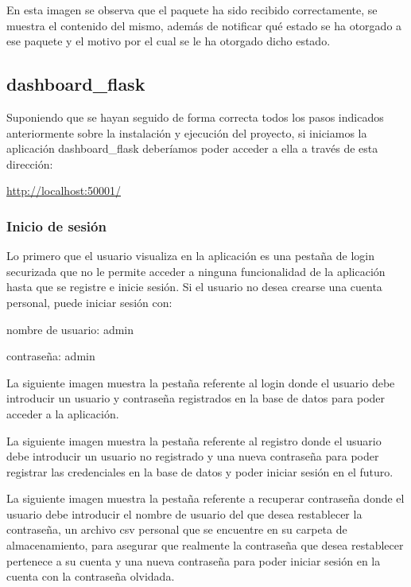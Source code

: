 En esta imagen se observa que el paquete ha sido recibido correctamente, se muestra el contenido del mismo, además de notificar qué estado se ha otorgado a ese paquete y el motivo por el cual se le ha otorgado dicho estado. 

\subsection{dashboard\_flask}
Suponiendo que se hayan seguido de forma correcta todos los pasos indicados anteriormente sobre la instalación y ejecución del proyecto, si iniciamos la aplicación dashboard\_flask deberíamos poder acceder a ella a través de esta dirección:

\href{http://localhost:5001/}{http://localhost:50001/}


\subsubsection{Inicio de sesión}
Lo primero que el usuario visualiza en la aplicación es una pestaña de login securizada que no le permite acceder a ninguna funcionalidad de la aplicación hasta que se registre e inicie sesión. Si el usuario no desea crearse una cuenta personal, puede iniciar sesión con:

nombre de usuario: admin

contraseña: admin

La siguiente imagen muestra la pestaña referente al login donde el usuario debe introducir un usuario y contraseña registrados en la base de datos para poder acceder a la aplicación.


La siguiente imagen muestra la pestaña referente al registro donde el usuario debe introducir un usuario no registrado y una nueva contraseña para poder registrar las credenciales en la base de datos y poder iniciar sesión en el futuro.


La siguiente imagen muestra la pestaña referente a recuperar contraseña donde el usuario debe introducir el nombre de  usuario del que desea restablecer la contraseña, un archivo csv personal que se encuentre en su carpeta de almacenamiento, para asegurar que realmente la contraseña que desea restablecer pertenece a su cuenta  y una nueva contraseña para poder iniciar sesión en la cuenta con la contraseña olvidada.


